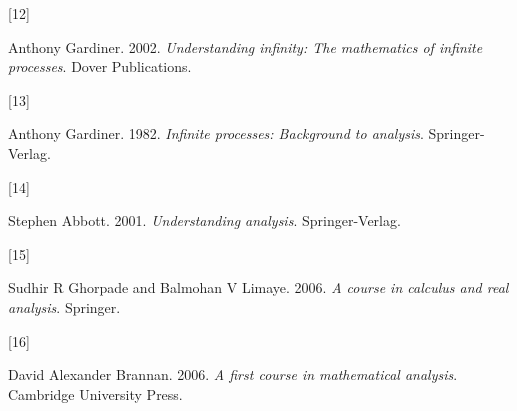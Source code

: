 \documentclass[
  a4paper,
]{article}
\newlength{\cslhangindent}
\newlength{\csllabelwidth}
\newenvironment{CSLReferences}[2] %
 {\begin{list}{}{%
  \setlength{\itemindent}{0pt}
  \setlength{\leftmargin}{0pt}
  \setlength{\parsep}{0pt}
  \ifodd #1
   \setlength{\leftmargin}{\cslhangindent}
   \setlength{\itemindent}{-1\cslhangindent}
  \fi
  \setlength{\itemsep}{#2\baselineskip}}}
 {\end{list}}
\newcommand{\CSLLeftMargin}[1]{\parbox[t]{\csllabelwidth}{\strut#1\strut}}
\newcommand{\CSLRightInline}[1]{\parbox[t]{\linewidth - \csllabelwidth}{\strut#1\strut}}
\begin{document}
\begin{CSLReferences}{0}{0}
\CSLLeftMargin{{[}12{]} }%
\CSLRightInline{Anthony Gardiner. 2002. \emph{Understanding infinity:
The mathematics of infinite processes}. Dover Publications.}

\CSLLeftMargin{{[}13{]} }%
\CSLRightInline{Anthony Gardiner. 1982. \emph{Infinite processes:
Background to analysis}. Springer-Verlag.}

\CSLLeftMargin{{[}14{]} }%
\CSLRightInline{Stephen Abbott. 2001. \emph{Understanding analysis}.
Springer-Verlag.}

\CSLLeftMargin{{[}15{]} }%
\CSLRightInline{Sudhir R Ghorpade and Balmohan V Limaye. 2006. \emph{A
course in calculus and real analysis}. Springer.}

\CSLLeftMargin{{[}16{]} }%
\CSLRightInline{David Alexander Brannan. 2006. \emph{A first course in
mathematical analysis}. Cambridge University Press.}

\end{CSLReferences}
\end{document}
